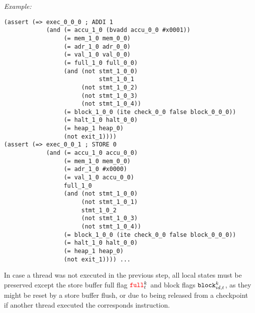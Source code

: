 \noindent
\emph{Example:} 

\begin{lstlisting}[style=smtlib]
(assert (=> exec_0_0_0 ; ADDI 1
            (and (= accu_1_0 (bvadd accu_0_0 #x0001))
                 (= mem_1_0 mem_0_0)
                 (= adr_1_0 adr_0_0)
                 (= val_1_0 val_0_0)
                 (= full_1_0 full_0_0)
                 (and (not stmt_1_0_0)
                           stmt_1_0_1
                      (not stmt_1_0_2)
                      (not stmt_1_0_3)
                      (not stmt_1_0_4))
                 (= block_1_0_0 (ite check_0_0 false block_0_0_0))
                 (= halt_1_0 halt_0_0)
                 (= heap_1 heap_0)
                 (not exit_1))))
(assert (=> exec_0_0_1 ; STORE 0
            (and (= accu_1_0 accu_0_0)
                 (= mem_1_0 mem_0_0)
                 (= adr_1_0 #x0000)
                 (= val_1_0 accu_0_0)
                 full_1_0
                 (and (not stmt_1_0_0)
                      (not stmt_1_0_1)
                      stmt_1_0_2
                      (not stmt_1_0_3)
                      (not stmt_1_0_4))
                 (= block_1_0_0 (ite check_0_0 false block_0_0_0))
                 (= halt_1_0 halt_0_0)
                 (= heap_1 heap_0)
                 (not exit_1)))) ...
\end{lstlisting}


\noindent
In case a thread was not executed in the previous step, all local states must be preserved except the store buffer full flag ${\color{red}\texttt{full}}^k_t$ and block flags $\texttt{block}^k_{id, t}$, as they might be reset by a store buffer flush, or due to being released from a checkpoint if another thread executed the corresponds  instruction.

